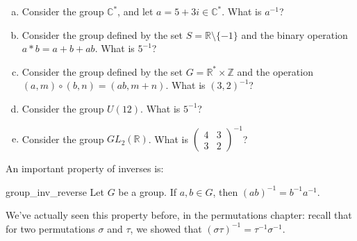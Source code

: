 \begin{exercise}{39}
\begin{enumerate}[(a)]
\item
Consider the group ${\mathbb C}^{\ast}$, and let  $a = 5 + 3i  \in {\mathbb C}^{\ast}$.  What is $a^{-1}$? 
\item
Consider the group defined by the set $S = {\mathbb R} \setminus \{ -1 \}$ and the binary operation $a \ast b = a + b +ab$.  What is $5^{-1}$? 
\item
Consider the group defined by the set $G = {\mathbb R}^{\ast} \times {\mathbb Z}$ and the operation $(a,m) \circ (b,n) = (ab, m+n)$.  What is $(3,2)^{-1}$?
\item
Consider the group $U(12)$.  What is $5^{-1}$?
\item
Consider the group $GL_2({\mathbb R})$.  What is 
$\begin{pmatrix}
4 & 3 \\
3 & 2
\end{pmatrix}^{-1}$?
\end{enumerate}
\end{exercise}{}

\noindent
An important property of inverses is:

\begin{prop}{group_inv_reverse}
Let $G$ be a group. If $a, b \in G$, then $(ab)^{-1} = b^{-1}a^{-1}$. 
\end{prop}

\begin{rem}
We've actually seen this property before, in the permutations chapter: recall that for two permutations $\sigma$ and $\tau$, we showed that
$(\sigma \tau)^{-1} = \tau^{-1} \sigma^{-1}.$
\end{rem}

